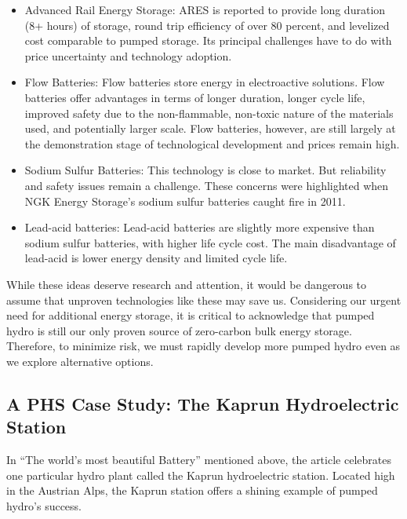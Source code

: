 \documentclass[hidelinks,12pt,a4paper]{article}
\begin{document}
{\footnotesize
\begin{itemize}
    \item Advanced Rail Energy Storage: ARES is reported to provide long duration (8+ hours) of storage, round trip efficiency of over 80 percent, and levelized cost comparable to pumped storage. Its principal challenges have to do with price uncertainty and technology adoption. \cite{EnergyStorageCaliforniaClimateandEnergyGoals}

    \item Flow Batteries: Flow batteries store energy in electroactive solutions. Flow batteries offer advantages in terms of longer duration, longer cycle life, improved safety due to the non-flammable, non-toxic nature of the materials used, and potentially larger scale. Flow batteries, however, are still largely at the demonstration stage of technological development and prices remain high. \cite{EnergyStorageCaliforniaClimateandEnergyGoals}

    \item Sodium Sulfur Batteries: This technology is close to market. But reliability and safety issues remain a challenge. These concerns were highlighted when NGK Energy Storage’s sodium sulfur batteries caught fire in 2011. \cite{EnergyStorageCaliforniaClimateandEnergyGoals}

    \item Lead-acid batteries: Lead-acid batteries are slightly more expensive than sodium sulfur batteries, with higher life cycle cost. The main disadvantage of lead-acid is lower energy density and limited cycle life. \cite{EnergyStorageCaliforniaClimateandEnergyGoals}
\end{itemize}
}

While these ideas deserve research and attention, it would be dangerous to assume that unproven technologies like these may save us.
Considering our urgent need for additional energy storage, it is critical to acknowledge that pumped hydro is still our only proven source of zero-carbon bulk energy storage. Therefore, to minimize risk, we must rapidly develop more pumped hydro even as we explore alternative options.

\subsection{A PHS Case Study: The Kaprun Hydroelectric Station}
In “The world's most beautiful Battery” mentioned above, the article celebrates one particular hydro plant called the Kaprun hydroelectric station. Located high in the Austrian Alps, the Kaprun station offers a shining example of pumped hydro's success.
\end{document}
